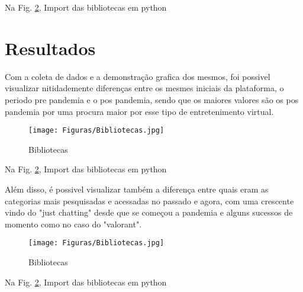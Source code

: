 Na Fig. \ref{figura:qualquernome}, Import das bibliotecas em python
\section{Resultados}

Com a coleta de dados e a demonstração grafica dos mesmos, foi possivel visualizar nitidademente diferenças entre os mesmes iniciais da plataforma, o periodo pre pandemia e o pos pandemia, sendo que os maiores valores são os pos pandemia por uma procura maior por esse tipo de entretenimento virtual.

\begin{figure}[h]
\caption{Bibliotecas}
 
\centering %
\texttt{[image: Figuras/Bibliotecas.jpg]} %
\label{figura:qualquernome}
\end{figure}
Na Fig. \ref{figura:qualquernome}, Import das bibliotecas em python

Além disso, é possivel visualizar também a diferença entre quais eram as categorias mais pesquisadas e acessadas no passado e agora, com uma crescente vindo do "just chatting"  desde que se começou a pandemia e alguns sucessos de momento como no caso do "valorant".

\begin{figure}[h]
\caption{Bibliotecas}
 
\centering %
\texttt{[image: Figuras/Bibliotecas.jpg]} %
\label{figura:qualquernome}
\end{figure}
Na Fig. \ref{figura:qualquernome}, Import das bibliotecas em python

